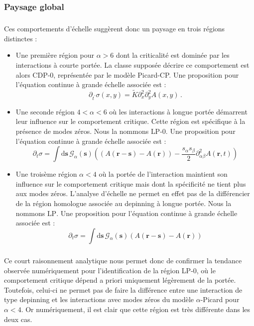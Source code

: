 \subsubsection{Paysage global}

\subparagraph{}Ces comportements d'échelle suggèrent donc un paysage en trois régions distinctes :

\begin{itemize}
	\item Une première région pour $\alpha>6$ dont la criticalité est dominée par les interactions à courte portée. La classe supposée décrire ce comportement est alors CDP-0, représentée par le modèle Picard-CP. Une proposition pour l'équation continue à grande échelle associée est :
\begin{equation}
	    \partial_{t^\prime}\sigma (x,y) = \tilde{K}\partial_x^{2}\partial_y^{2}A(x, y)\, .
\end{equation}
	\item Une seconde région $4<\alpha<6$ où les interactions à longue portée démarrent leur influence sur le comportement critique. Cette région est spécifique à la présence de modes zéros. Nous la nommons $\text{LP-0}$. Une proposition pour l'équation continue à grande échelle associée est : 
\begin{equation}
    \partial_t \sigma = 
    \int \mathrm{d}\bm{s}\, \mathcal{G}_\alpha(\bm{s}) \left(  \left( A(\mathbf{r}-\mathbf{s})-A(\mathbf{r})\right) - \frac{s_\alpha s_\beta}{2}\partial^2_{\alpha\beta} A(\bm{r}, t)\right)
\end{equation}
	\item Une troisème région $\alpha <4$ où la portée de l'interaction maintient son influence sur le comportement critique mais dont la spécificité ne tient plus aux modes zéros. L'analyse d'échelle ne permet en effet pas de la différencier de la région homologue associée au depinning à longue portée. Nous la nommons $\text{LP}$. Une proposition pour l'équation continue à grande échelle associée est :
	\begin{equation}
    \partial_t \sigma = 
    \int \mathrm{d}\bm{s}\, \mathcal{G}_\alpha(\bm{s}) \left( A(\mathbf{r}-\mathbf{s})-A(\mathbf{r})\right)
\end{equation}
\end{itemize}

\subparagraph{}Ce court raisonnement analytique nous permet donc de confirmer la tendance observée numériquement pour l'identification de la région LP-0, où le comportement critique dépend a priori uniquement légèrement de la portée. Toutefois, celui-ci ne permet pas de faire la différence entre une interaction de type depinning et les interactions avec modes zéros du modèle $\alpha$-Picard pour $\alpha<4$. Or numériquement, il est clair que cette région est très différente dans les deux cas.

